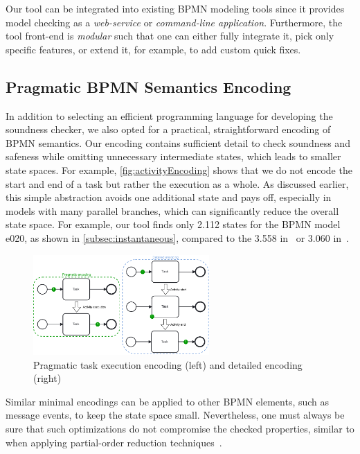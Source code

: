 \documentclass[runningheads]{llncs}
\begin{document}
Our tool can be integrated into existing BPMN modeling tools since it provides model checking as a \textit{web-service} or \textit{command-line application}.
Furthermore, the tool front-end is \textit{modular} such that one can either fully integrate it, pick only specific features, or extend it, for example, to add custom quick fixes.

\subsection{Pragmatic BPMN Semantics Encoding}
In addition to selecting an efficient programming language for developing the soundness checker, we also opted for a practical, straightforward encoding of BPMN semantics.
Our encoding contains sufficient detail to check soundness and safeness while omitting unnecessary intermediate states, which leads to smaller state spaces.
For example, \autoref{fig:activityEncoding} shows that we do not encode the start and end of a task but rather the execution as a whole.
As discussed earlier, this simple abstraction avoids one additional state and pays off, especially in models with many parallel branches, which can significantly reduce the overall state space.
For example, our tool finds only 2.112 states for the BPMN model \textsf{e020}, as shown in \autoref{subsec:instantaneous}, compared to the 3.558 in~\cite{houhouFirstOrderLogicVerification2022} or 3.060 in~\cite{krauterFormalizationAnalysisBPMN2023}.

\begin{figure}[ht]
	\centering
	\includegraphics[width=0.6\textwidth]{images/pragmatic-encoding}
	\caption{Pragmatic task execution encoding (left) and detailed encoding (right)}
	\label{fig:activityEncoding}
\end{figure}

Similar minimal encodings can be applied to other BPMN elements, such as message events, to keep the state space small.
Nevertheless, one must always be sure that such optimizations do not compromise the checked properties, similar to when applying partial-order reduction techniques~\cite{valmariStateExplosionProblem1998}.
\end{document}
